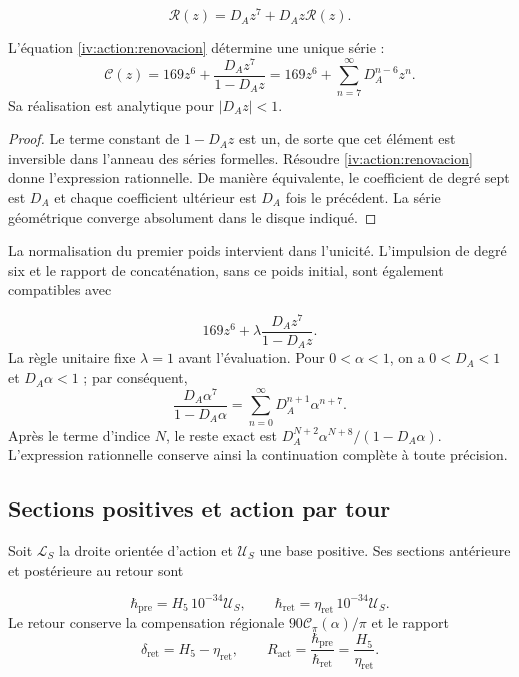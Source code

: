 \begin{equation}
 \mathscr R(z)=D_Az^7+D_Az\mathscr R(z).
 \label{iv:action:renovacion}
\end{equation}

\begin{proposition}
\label{iv:action:unicidad-renovacion}
L’équation \eqref{iv:action:renovacion} détermine une unique série :
\begin{equation}
 \mathscr C(z)=169z^6+\frac{D_Az^7}{1-D_Az}
             =169z^6+\sum_{n=7}^{\infty}D_A^{n-6}z^n.
 \label{iv:action:serie-renovacion}
\end{equation}
Sa réalisation est analytique pour \(|D_Az|<1\).
\end{proposition}
\begin{proof}
Le terme constant de \(1-D_Az\) est un, de sorte que cet
élément est inversible dans l’anneau des séries formelles.
Résoudre \eqref{iv:action:renovacion} donne l’expression rationnelle.
De manière équivalente, le coefficient de degré sept est \(D_A\) et chaque
coefficient ultérieur est \(D_A\) fois le précédent. La série
géométrique converge absolument dans le disque indiqué.
\end{proof}

La normalisation du premier poids intervient dans l’unicité.
L’impulsion de degré six et le rapport de concaténation, sans ce
poids initial, sont également compatibles avec

\[
 169z^6+\lambda\frac{D_Az^7}{1-D_Az}.
\]
La règle unitaire fixe \(\lambda=1\) avant l’évaluation.
Pour \(0<\alpha<1\), on a \(0<D_A<1\) et \(D_A\alpha<1\) ;
par conséquent,
\begin{equation}
 \frac{D_A\alpha^7}{1-D_A\alpha}
   =\sum_{n=0}^{\infty}D_A^{n+1}\alpha^{n+7}.
 \label{iv:action:cola}
\end{equation}
Après le terme d’indice \(N\), le reste exact est
\(D_A^{N+2}\alpha^{N+8}/(1-D_A\alpha)\). L’expression rationnelle
conserve ainsi la continuation complète à toute précision.

\subsection{Sections positives et action par tour
}
\label{iv:action:secciones}

Soit \(\mathcal L_S\) la droite orientée d’action et
\(\mathcal U_S\) une base positive. Ses sections antérieure et
postérieure au retour sont

\begin{equation}
 \hbar_{\mathrm{pre}}=H_5\,10^{-34}\mathcal U_S,\qquad
 \hbar_{\mathrm{ret}}=\eta_{\mathrm{ret}}\,10^{-34}\mathcal U_S.
 \label{iv:action:hbar}
\end{equation}
Le retour conserve la compensation régionale
\(90\mathcal C_\pi(\alpha)/\pi\) et le rapport
\begin{equation}
 \delta_{\mathrm{ret}}=H_5-\eta_{\mathrm{ret}},\qquad
 R_{\mathrm{act}}=\frac{\hbar_{\mathrm{pre}}}
                        {\hbar_{\mathrm{ret}}}
                =\frac{H_5}{\eta_{\mathrm{ret}}}.
 \label{iv:action:razon}
\end{equation}

